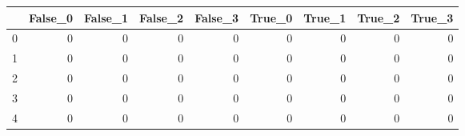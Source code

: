 \begin{tabular}{lrrrrrrrr}
\toprule
{} &  False\_0 &  False\_1 &  False\_2 &  False\_3 &  True\_0 &  True\_1 &  True\_2 &  True\_3 \\ \hline
\midrule
0 &        0 &        0 &        0 &        0 &       0 &       0 &       0 &       0 \\ \hline
1 &        0 &        0 &        0 &        0 &       0 &       0 &       0 &       0 \\ \hline
2 &        0 &        0 &        0 &        0 &       0 &       0 &       0 &       0 \\ \hline
3 &        0 &        0 &        0 &        0 &       0 &       0 &       0 &       0 \\ \hline
4 &        0 &        0 &        0 &        0 &       0 &       0 &       0 &       0 \\ \hline
\bottomrule
\end{tabular}
